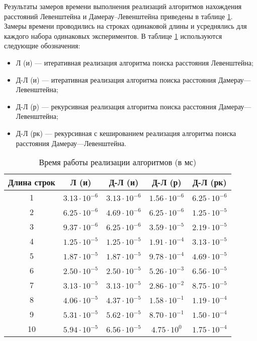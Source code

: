 Результаты замеров времени выполнения реализаций алгоритмов нахождения расстояний
Левенштейна и Дамерау–Левенштейна приведены в таблице \ref{tbl:time_measurements}.
Замеры времени проводились на строках одинаковой длины и усреднялись для каждого набора одинаковых экспериментов.
В таблице \ref{tbl:time_measurements} используются следующие обозначения: 
\begin{itemize}
	\item Л (и) --- итеративная реализация алгоритма поиска расстояния Левенштейна;
	\item Д-Л (и) --- итеративная реализация алгоритма поиска расстояния Дамерау---Левенштейна;
	\item Д-Л (р) --- рекурсивная реализация алгоритма поиска расстояния Дамерау---Левенштейна;
	\item Д-Л (рк) --- рекурсивная с кешированием реализация алгоритма поиска расстояния Дамерау---Левенштейна.
\end{itemize}

\begin{table}[h]
	\begin{center}
		\begin{threeparttable}
			\captionsetup{justification=raggedright,singlelinecheck=off}
			\caption{Время работы реализации алгоритмов (в мс)}
			\label{tbl:time_measurements}
			\begin{tabular}{|c|c|c|c|c|}
				\hline
				Длина строк &  Л (и)  & Д-Л (и) & Д-Л (р) & Д-Л (рк) \\
				\hline
				1 &$ 3.13\cdot 10^{-6} $&$ 3.13\cdot 10^{-6} $&$ 1.56\cdot 10^{-6} $&$ 6.25\cdot 10^{-6}$\\
			\hline
			2 &$ 6.25\cdot 10^{-6} $&$ 4.69\cdot 10^{-6} $&$ 6.25\cdot 10^{-6} $&$ 1.25\cdot 10^{-5}$\\
			\hline
			3 &$ 9.37\cdot 10^{-6} $&$ 6.25\cdot 10^{-6} $&$ 3.59\cdot 10^{-5} $&$ 2.19\cdot 10^{-5}$\\
			\hline
			4 &$ 1.25\cdot 10^{-5} $&$ 1.25\cdot 10^{-5} $&$ 1.91\cdot 10^{-4} $&$ 3.13\cdot 10^{-5}$\\
			\hline
			5 &$ 1.87\cdot 10^{-5} $&$ 1.87\cdot 10^{-5} $&$ 9.78\cdot 10^{-4} $&$ 4.69\cdot 10^{-5}$\\
			\hline
			6 &$ 2.50\cdot 10^{-5} $&$ 2.50\cdot 10^{-5} $&$ 5.26\cdot 10^{-3} $&$ 6.56\cdot 10^{-5}$\\
			\hline
			7 &$ 3.13\cdot 10^{-5} $&$ 3.13\cdot 10^{-5} $&$ 2.86\cdot 10^{-2} $&$ 8.75\cdot 10^{-5}$\\
			\hline
			8 &$ 4.06\cdot 10^{-5} $&$ 4.37\cdot 10^{-5} $&$ 1.58\cdot 10^{-1} $&$ 1.19\cdot 10^{-4}$\\
			\hline
			9 &$ 5.31\cdot 10^{-5} $&$ 5.62\cdot 10^{-5} $&$ 8.70\cdot 10^{-1} $&$ 1.50\cdot 10^{-4}$\\
			\hline
			10 &$ 5.94\cdot 10^{-5} $&$ 6.56\cdot 10^{-5} $&$ 4.75\cdot 10^{0} $&$ 1.75\cdot 10^{-4}$\\
				\hline
				
				
			\end{tabular}
		\end{threeparttable}
	\end{center}
\end{table}

